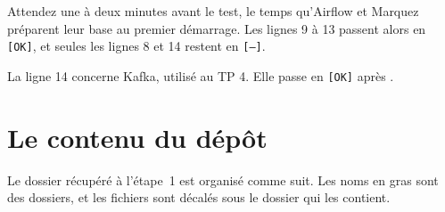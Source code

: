 \begin{resultat}
Attendez une à deux minutes avant le test, le temps qu'Airflow et Marquez préparent leur base au
premier démarrage. Les lignes 9 à 13 passent alors en \texttt{[OK]}, et seules les lignes 8 et 14
restent en \texttt{[--]}.
\end{resultat}

La ligne 14 concerne Kafka, utilisé au TP 4. Elle passe en \texttt{[OK]} après
.

\section{Le contenu du dépôt}\label{c2:sec:depot}

Le dossier  récupéré à l'étape~1 est organisé comme suit. Les noms en gras
sont des dossiers, et les fichiers sont décalés sous le dossier qui les contient.



